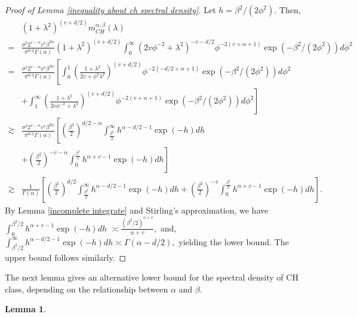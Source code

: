 \documentclass[ejs,noshowframe]{imsart}
\theoremstyle{plain}
\newtheorem{lemma}[theorem]{Lemma}
\theoremstyle{definition}
\theoremstyle{remark}
\begin{document}
\begin{appendix}
\begin{proof}  [Proof of Lemma \ref{inequality about ch spectral density}] Let  
$h=\beta^2/(2\phi^2)$. Then,
\begin{displaymath}
\begin{split}
&(1+\lambda^2)^{(v+d/2)}m^{\alpha,\beta}_{CH}(\lambda) \\
=&  \frac{\sigma^2 2^{v-\alpha} v^v \beta^{2\alpha}}{\pi^{d/2}\Gamma(\alpha)}(1+\lambda^2)^{(v+d/2)}\int_0^{\infty} (2v\phi^{-2}+\lambda^2)^{-v-d/2}  \phi^{-2(v+\alpha+1)} \exp{(-\beta^2/(2\phi^2))d\phi^2}  \\
           =& \frac{\sigma^2 2^{v-\alpha} v^v \beta^{2\alpha}}{\pi^{d/2}\Gamma(\alpha)} 
           \left[\int_0^{1}  \left(\frac{1+\lambda^2}{2v+\phi^2\lambda^2}\right)^{(v+d/2)}\phi^{-2(-d/2+\alpha+1)} \exp{(-\beta^2/(2\phi^2))}d\phi^2\right.\\
           &+\left.\int_1^{\infty}  \left(\frac{1+\lambda^2}{2v\phi^{-2}+\lambda^2}\right)^{(v+d/2)}\phi^{-2(v+\alpha+1)} \exp{(-\beta^2/(2\phi^2))}d\phi^2\right] \\  
           \gtrsim& \frac{\sigma^2 2^{v-\alpha} v^v \beta^{2\alpha}}{\pi^{d/2}\Gamma(\alpha)} \left[\left(\frac{\beta^2}{2}\right)^{d/2-\alpha}\int_{\frac{\beta^2}{2}}^{\infty}h^{\alpha-d/2-1}\exp(-h) dh \right. \\
           &+\left. \left(\frac{\beta^2}{2}\right)^{-v-\alpha}\int^{\frac{\beta^2}{2}}_{0}h^{\alpha+v-1}\exp(-h) dh \right]\\
           \gtrsim& \frac{1}{\Gamma(\alpha)} \left[\left(\frac{\beta^2}{2}\right)^{d/2}\int_{\frac{\beta^2}{2}}^{\infty}h^{\alpha-d/2-1}\exp(-h) dh+
           \left(\frac{\beta^2}{2}\right)^{-v}\int^{\frac{\beta^2}{2}}_{0}h^{\alpha+v-1}\exp(-h) dh\right].
\end{split}
\end{displaymath}
By Lemma \ref{incomplete integrate} and Stirling’s approximation, we have 
$
    \int^{{\beta^2}/{2}}_{0}h^{\alpha+v-1}\exp(-h) dh $ $\asymp \frac{({\beta^2}/{2})^{\alpha+v}}{\alpha+v},
$
and,
$
    \int_{{\beta^2}/{2}}^{\infty}h^{\alpha-d/2-1}\exp(-h) dh \asymp  \Gamma(\alpha-d/2),
$
yielding the lower bound. The upper bound follows similarly. 
\end{proof}
The next lemma gives an alternative lower bound for  the spectral density of CH class, depending on the relationship between $\alpha$ and $\beta$.
\begin{lemma} \label{CH spectral density tail behavior}

\end{lemma}
\end{appendix}
\end{document}
